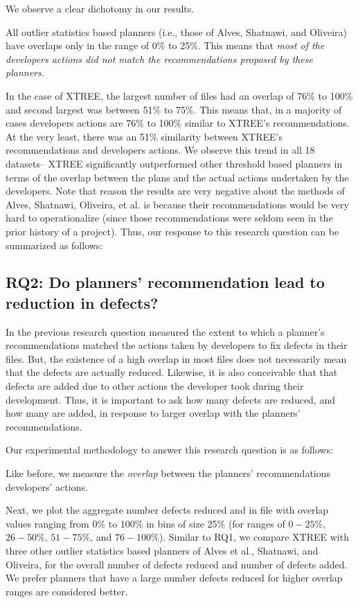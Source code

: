 We observe a clear dichotomy in our results. 
\bi
\item All outlier statistics based planners (i.e., those of Alves, Shatnawi, and Oliveira) have overlaps only in the range of 0\% to 25\%. This means that \textit{most of the developers actions did not match the recommendations proposed by these planners.}
\item In the case of XTREE, the largest number of files had an overlap of 76\% to 100\% and second largest was between 51\% to 75\%. This means that, in a majority of cases developers actions are 76\% to 100\% similar to XTREE's recommendations. At the very least, there was an 51\% similarity between XTREE's recommendations and developers actions.
\ei
We observe this trend in all 18 datasets-- XTREE significantly outperformed other threshold based planners in terms of the overlap between the plans and the actual actions undertaken by the developers. Note that reason the results are very negative about the methods of Alves, Shatnawi, Oliveira, et al. is because their recommendations would be very hard to operationalize (since those recommendations were seldom seen in the prior history of a project). Thus, our response to this research question can be summarized as follows:



\subsection*{{\bf RQ2: Do planners' recommendation lead to reduction in defects?}}


In the previous research question measured the extent to which a planner's recommendations matched the actions taken by developers to fix defects in their files. But, the existence of a high overlap in most files does not necessarily mean that the defects are actually reduced. Likewise, it is also conceivable that that defects are added due to other actions the developer took during their development. Thus, it is important to ask how many defects are reduced, and how many are added, in response to larger overlap with the planners' recommendations.

Our experimental methodology to answer this research question is as follows: 
\bi
\item Like before, we measure the \textit{overlap} between the planners' recommendations developers' actions. \item Next, we plot the aggregate number defects reduced and in file with overlap values ranging from 0\% to 100\% in bins of size 25\% (for ranges of $0-25\%$, $26-50\%$, $51-75\%$, and $76-100\%$). 
\ei
Similar to RQ1, we compare XTREE with three other outlier statistics based planners of Alves et al., Shatnawi, and Oliveira, for the overall number of defects reduced and number of defects added. We prefer planners that have a large number defects reduced for higher overlap ranges are considered better.

